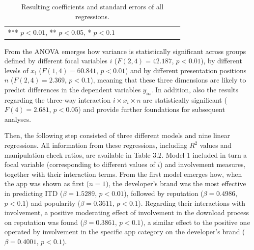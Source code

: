 \begin{table}
{\begin{tabular}{llllllllll}
*** $p<0.01$, ** $p<0.05$, * $p<0.1$       &                                                               &                                                               &                                                               &                                                               &                                                               &                                                                &                                                               &                                                               &                                                              
\end{tabular}}
\caption{Resulting coefficients and standard errors of all regressions.}
	\label{table:2}
\end{table}
From the ANOVA emerges how variance is statistically significant across groups defined by different focal variables $i$ ($F(2, 4)= 42.187$, $p<0.01$), by different levels of $x_i$ ($F(1, 4)=60.841$, $p<0.01$) and by different presentation positions $n$ ($F(2, 4)=2.369$, $p<0.1$), meaning that these three dimensions are likely to predict differences in the dependent variables $y_{in}$. In addition, also the results regarding the three-way interaction $i\times x_i \times n$ are statistically significant ($F(4)=2.681$, $p<0.05$) and provide further foundations for subsequent analyses.







Then, the following step consisted of three different models and nine linear regressions. All information from these regressions, including $R^2$ values and manipulation check ratios, are available in Table 3.2. Model 1 included in turn a focal variable (corresponding to different values of $i$) and involvement measures, together with their interaction terms. From the first model emerges how, when the app was shown as first ($n=1$), the developer's brand was the most effective in predicting ITD ($\beta=1.5289$, $p<0.01$), followed by reputation ($\beta=0.4986$, $p<0.1$) and popularity ($\beta=0.3611$, $p<0.1$). Regarding their interactions with involvement, a positive moderating effect of involvement in the download process on reputation was found ($\beta=0.3861$, $p<0.1$), a similar effect to the positive one operated by involvement in the specific app category on the developer's brand ($\beta=0.4001$, $p<0.1$).


